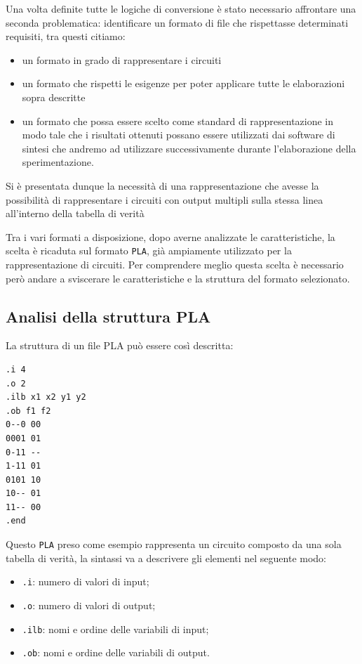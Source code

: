 \documentclass[
  italian,
]{book}
\providecommand{\tightlist}{%
  \setlength{\itemsep}{0pt}\setlength{\parskip}{0pt}}
\begin{document}
Una volta definite tutte le logiche di conversione è stato necessario affrontare una seconda problematica: identificare un formato di file che rispettasse determinati requisiti, tra questi citiamo:

\begin{itemize}
\tightlist
\item
  un formato in grado di rappresentare i circuiti
\item
  un formato che rispetti le esigenze per poter applicare tutte le elaborazioni sopra descritte
\item
  un formato che possa essere scelto come standard di rappresentazione in modo tale che i risultati ottenuti possano essere utilizzati dai software di sintesi che andremo ad utilizzare successivamente durante l'elaborazione della sperimentazione.
\end{itemize}

\newpage

Si è presentata dunque la necessità di una rappresentazione che avesse la possibilità di rappresentare i circuiti con output multipli sulla stessa linea all'interno della tabella di verità

Tra i vari formati a disposizione, dopo averne analizzate le caratteristiche, la scelta è ricaduta sul formato \texttt{PLA}, già ampiamente utilizzato per la rappresentazione di circuiti.
Per comprendere meglio questa scelta è necessario però andare a sviscerare le caratteristiche e la struttura del formato selezionato.

\hypertarget{analisi-della-struttura-pla}{%
\subsection{Analisi della struttura PLA}\label{analisi-della-struttura-pla}}

La struttura di un file PLA può essere così descritta:

\begin{verbatim}
.i 4
.o 2
.ilb x1 x2 y1 y2
.ob f1 f2
0--0 00    
0001 01
0-11 --
1-11 01
0101 10
10-- 01
11-- 00
.end
\end{verbatim}

Questo \texttt{PLA} preso come esempio rappresenta un circuito composto da una sola tabella di verità, la sintassi va a descrivere gli elementi nel seguente modo:

\begin{itemize}
\tightlist
\item
  \texttt{.i}: numero di valori di input;
\item
  \texttt{.o}: numero di valori di output;
\item
  \texttt{.ilb}: nomi e ordine delle variabili di input;
\item
  \texttt{.ob}: nomi e ordine delle variabili di output.
\end{itemize}
\end{document}
